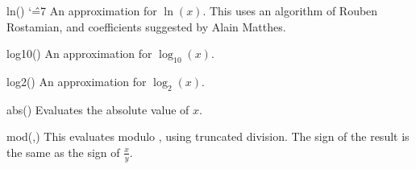 \begin{math-function}{ln()}
\mathcommand
{ \catcode`\^=7
    An approximation for $\ln(x)$. This uses an algorithm of
    Rouben Rostamian, and coefficients suggested by Alain Matthes.
}
\begin{codeexample}[]
 \pgfmathresult
\end{codeexample}

\begin{codeexample}[]
 \pgfmathresult
\end{codeexample}
\end{math-function}

\begin{math-function}{log10()}
    An approximation for $\log_{10}(x)$.
\begin{codeexample}[]
 \pgfmathresult
\end{codeexample}
\end{math-function}

\begin{math-function}{log2()}
    An approximation for $\log_2(x)$.
\begin{codeexample}[]
 \pgfmathresult
\end{codeexample}
\end{math-function}

\begin{math-function}{abs()}
\mathcommand
    Evaluates the absolute value of $x$.
\begin{codeexample}[]
 \pgfmathresult
\end{codeexample}

\begin{codeexample}[]
 \pgfmathresult
\end{codeexample}
\end{math-function}

\begin{math-function}{mod(,)}
\mathcommand
    This evaluates  modulo , using truncated division. The sign
    of the result is the same as the sign of
    $\frac{x}{y}$.
\begin{codeexample}[]
 \pgfmathresult
\end{codeexample}

\begin{codeexample}[]
 \pgfmathresult
\end{codeexample}
\end{math-function}


